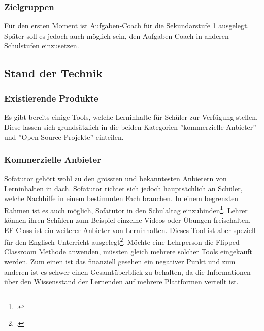 \subsubsection{Zielgruppen}
Für den ersten Moment ist Aufgaben-Coach für die Sekundarstufe 1 ausgelegt. Später soll es jedoch auch möglich sein, den Aufgaben-Coach in anderen Schulstufen einzusetzen.

\subsection{Stand der Technik}
\subsubsection{Existierende Produkte}
Es gibt bereits einige Tools, welche Lerninhalte für Schüler zur Verfügung stellen. Diese lassen sich grundsätzlich in die beiden Kategorien ''kommerzielle Anbieter'' und ''Open Source Projekte'' einteilen.

\subsubsection*{Kommerzielle Anbieter}
Sofatutor gehört wohl zu den grössten und bekanntesten Anbietern von Lerninhalten in \gls{dach}. Sofatutor richtet sich jedoch hauptsächlich an Schüler, welche Nachhilfe in einem bestimmten Fach brauchen. In einem begrenzten Rahmen ist es auch möglich, Sofatutor in den Schulaltag einzubinden\footcite{sofatutor_fuer_lehrer}. Lehrer können ihren Schülern zum Beispiel einzelne Videos oder Übungen freischalten. \\

EF Class ist ein weiterer Anbieter von Lerninhalten. Dieses Tool ist aber speziell für den Englisch Unterricht ausgelegt\footcite{ef_class_homepage}. Möchte eine Lehrperson die Flipped Classroom Methode anwenden, müssten gleich mehrere solcher Tools eingekauft werden. Zum einen ist das finanziell gesehen ein negativer Punkt und zum anderen ist es schwer einen Gesamtüberblick zu behalten, da die Informationen über den Wissensstand der Lernenden auf mehrere Plattformen verteilt ist.


